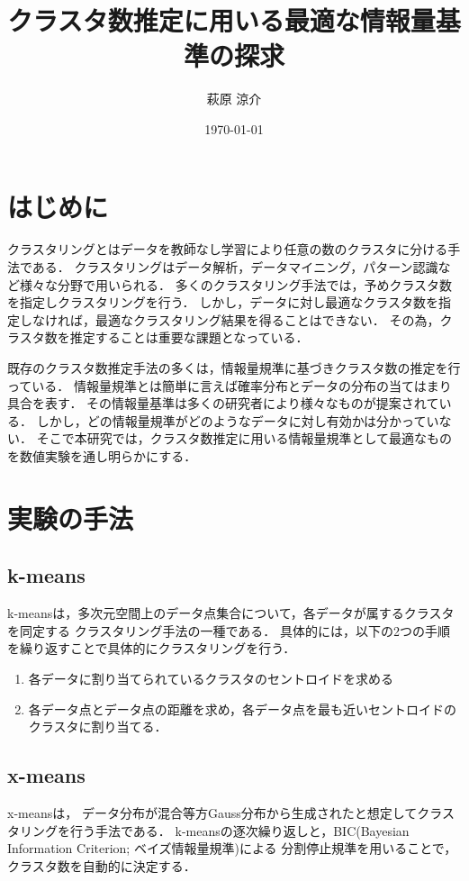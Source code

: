 \documentclass[9pt,a4j,twocolumn]{ltjsarticle}
\author{萩原 涼介}
\title{クラスタ数推定に用いる最適な情報量基準の探求}
\date{\today}
\begin{document}
\maketitle
\section{はじめに}
クラスタリングとはデータを教師なし学習により任意の数のクラスタに分ける手法である．
クラスタリングはデータ解析，データマイニング，パターン認識など様々な分野で用いられる．
多くのクラスタリング手法では，予めクラスタ数を指定しクラスタリングを行う．
しかし，データに対し最適なクラスタ数を指定しなければ，最適なクラスタリング結果を得ることはできない．
その為，クラスタ数を推定することは重要な課題となっている．

既存のクラスタ数推定手法の多くは，情報量規準に基づきクラスタ数の推定を行っている．
情報量規準とは簡単に言えば確率分布とデータの分布の当てはまり具合を表す．
その情報量基準は多くの研究者により様々なものが提案されている．
しかし，どの情報量規準がどのようなデータに対し有効かは分かっていない．
そこで本研究では，クラスタ数推定に用いる情報量規準として最適なものを数値実験を通し明らかにする．

\section{実験の手法}
% 
\subsection{k-means}
k-means\cite{macqueen1967some}は，多次元空間上のデータ点集合について，各データが属するクラスタを同定する
クラスタリング手法の一種である．
具体的には，以下の2つの手順を繰り返すことで具体的にクラスタリングを行う．
\begin{enumerate}
  \item 各データに割り当てられているクラスタのセントロイドを求める
  \item 各データ点とデータ点の距離を求め，各データ点を最も近いセントロイドのクラスタに割り当てる．
\end{enumerate}

\subsection{x-means}
x-means\cite{pelleg2000x}は，
データ分布が混合等方Gauss分布から生成されたと想定してクラスタリングを行う手法である．
k-meansの逐次繰り返しと，BIC(Bayesian Information Criterion; ベイズ情報量規準)による
分割停止規準を用いることで，クラスタ数を自動的に決定する．
\end{document}
